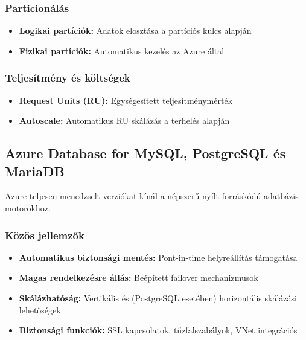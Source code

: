 \documentclass[a4paper,12pt]{article}
\begin{document}
    \subsubsection{Particionálás}

    \begin{itemize}
        \item \textbf{Logikai partíciók:} Adatok elosztása a partíciós kulcs alapján
        \item \textbf{Fizikai partíciók:} Automatikus kezelés az Azure által
    \end{itemize}

    \subsubsection{Teljesítmény és költségek}

    \begin{itemize}
        \item \textbf{Request Units (RU):} Egységesített teljesítménymérték
        \item \textbf{Autoscale:} Automatikus RU skálázás a terhelés alapján
    \end{itemize}

    \subsection{Azure Database for MySQL, PostgreSQL és MariaDB}

    Azure teljesen menedzselt verziókat kínál a népszerű nyílt forráskódú adatbázis-motorokhoz.

    \subsubsection{Közös jellemzők}

    \begin{itemize}
        \item \textbf{Automatikus biztonsági mentés:} Pont-in-time helyreállítás támogatása
        \item \textbf{Magas rendelkezésre állás:} Beépített failover mechanizmusok
        \item \textbf{Skálázhatóság:} Vertikális és (PostgreSQL esetében) horizontális skálázási lehetőségek
        \item \textbf{Biztonsági funkciók:} SSL kapcsolatok, tűzfalszabályok, VNet integrációs
    \end{itemize}
\end{document}
